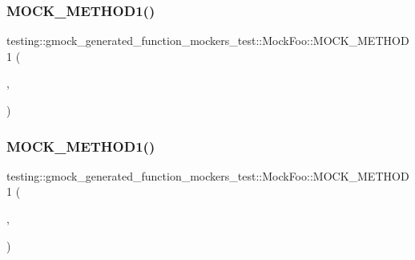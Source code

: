 \subsubsection{\texorpdfstring{MOCK\_METHOD1()}{MOCK\_METHOD1()}\hspace{0.1cm}{\footnotesize\ttfamily [30/32]}}
{\footnotesize\ttfamily testing\+::gmock\+\_\+generated\+\_\+function\+\_\+mockers\+\_\+test\+::\+Mock\+Foo\+::\+M\+O\+C\+K\+\_\+\+M\+E\+T\+H\+O\+D1 (\begin{DoxyParamCaption}\item[{\mbox{\hyperlink{classtesting_1_1gmock__generated__function__mockers__test_1_1_foo_interface_a64544adcb9c502a8fbc3990b53f4c767}{Type\+With\+Comma}}}]{,  }\item[{int(const std\+::map$<$ int, std\+::string $>$ \&)}]{ }\end{DoxyParamCaption})}

\mbox{\label{classtesting_1_1gmock__generated__function__mockers__test_1_1_mock_foo_afabde8ab238dcae147e72b16c246416d}} 
\subsubsection{\texorpdfstring{MOCK\_METHOD1()}{MOCK\_METHOD1()}\hspace{0.1cm}{\footnotesize\ttfamily [31/32]}}
{\footnotesize\ttfamily testing\+::gmock\+\_\+generated\+\_\+function\+\_\+mockers\+\_\+test\+::\+Mock\+Foo\+::\+M\+O\+C\+K\+\_\+\+M\+E\+T\+H\+O\+D1 (\begin{DoxyParamCaption}\item[{\mbox{\hyperlink{classtesting_1_1gmock__generated__function__mockers__test_1_1_foo_interface_ac3f47b680d4a46f2a77ebd76b7243187}{Type\+With\+Templated\+Copy\+Ctor}}}]{,  }\item[{int(const \mbox{\hyperlink{classtesting_1_1gmock__generated__function__mockers__test_1_1_templated_copyable}{Templated\+Copyable}}$<$ int $>$ \&)}]{ }\end{DoxyParamCaption})}

\mbox{\label{classtesting_1_1gmock__generated__function__mockers__test_1_1_mock_foo_afabde8ab238dcae147e72b16c246416d}} 
